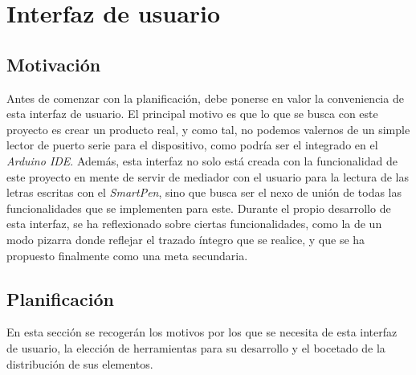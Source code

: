 \chapter{Interfaz de usuario}
\section{Motivación\label{justifUI}}
Antes de comenzar con la planificación, debe ponerse en valor la conveniencia
de esta interfaz de usuario. El principal motivo es que lo que se busca
con este proyecto es crear un producto real, y como tal, no podemos valernos
de un simple lector de puerto serie para el dispositivo, como podría ser
el integrado en el \textit{Arduino IDE}. Además, esta interfaz no solo está
creada con la funcionalidad de este proyecto en mente de servir de mediador
con el usuario para la lectura de las letras escritas con el \textit{SmartPen},
sino que busca ser el nexo de unión de todas las funcionalidades que se
implementen para este. Durante el propio desarrollo de esta interfaz, se
ha reflexionado sobre ciertas funcionalidades, como la de un modo pizarra
donde reflejar el trazado íntegro que se realice, y que se ha propuesto
finalmente como una meta secundaria.

\section{Planificación}
En esta sección se recogerán los motivos por los que se necesita de esta interfaz
de usuario, la elección de herramientas para su desarrollo y el bocetado de la distribución
de sus elementos.

